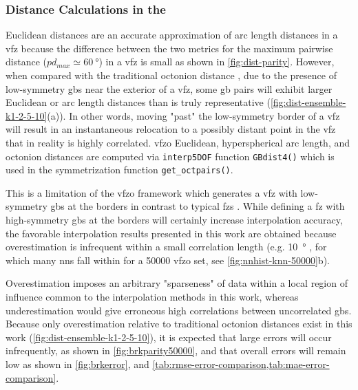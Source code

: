 \documentclass[final,twocolumn,12pt]{elsarticle}
\newcommand{\distfn}{GBdist4}
\begin{document}
\subsubsection{Distance Calculations in the }
\label{sec:methods:vfz-dist}

Euclidean distances are an accurate approximation of arc length distances in a \gls{vfz} because the difference between the two metrics for the maximum pairwise distance ($pd_{max} \simeq \SI{60}{\degree}$) in a \gls{vfz} is small as shown in \cref{fig:dist-parity}. However, when compared with the traditional octonion distance \cite{francisGeodesicOctonionMetric2019}, due to the presence of low-symmetry \glspl{gb} near the exterior of a \gls{vfz}, some \gls{gb} pairs will exhibit larger Euclidean or arc length distances than is truly representative (\cref{fig:dist-ensemble-k1-2-5-10}(a)). In other words, moving "past" the low-symmetry border of a \gls{vfz} will result in an instantaneous relocation to a possibly distant point in the \gls{vfz} that in reality is highly correlated. \Gls{vfzo} Euclidean, hyperspherical arc length, and octonion distances are computed via \texttt{interp5DOF} function \texttt{\distfn{}()} which is used in the symmetrization function \texttt{get\_octpairs()}.

This is a limitation of the \gls{vfzo} framework which generates a \gls{vfz} with low-symmetry \glspl{gb} at the borders in contrast to typical \glspl{fz} \cite{patalaSymmetriesRepresentationGrain2013,homerGrainBoundaryPlane2015}. While defining a \gls{fz} with high-symmetry \glspl{gb} at the borders will certainly increase interpolation accuracy, the favorable interpolation results presented in this work are obtained because overestimation is infrequent within a small correlation length (e.g. \SI{10}{\degree} \cite{olmstedSurveyComputedGrain2009}, for which many \glspl{nn} fall within for a \num{50000} \gls{vfzo} set, see \cref{fig:nnhist-knn-50000}b).

Overestimation imposes an arbitrary "sparseness" of data within a local region of influence common to the interpolation methods in this work, whereas underestimation would give erroneous high correlations between uncorrelated \glspl{gb}. Because only overestimation relative to traditional octonion distances exist in this work (\cref{fig:dist-ensemble-k1-2-5-10}), it is expected that large errors will occur infrequently, as shown in \cref{fig:brkparity50000}, and that overall errors will remain low as shown in \cref{fig:brkerror}, and \cref{tab:rmse-error-comparison,tab:mae-error-comparison}. 
\end{document}
